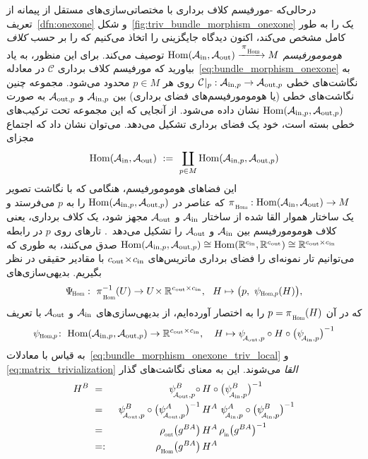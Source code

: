درحالی‌که -مورفیسم کلاف برداری با مختصاتی‌سازی‌های مستقل از پیمانه از تعریف~\ref{dfn:onexone} و شکل~\ref{fig:triv_bundle_morphism_onexone} یک \onexoneGM را به طور کامل مشخص می‌کند، اکنون دیدگاه جایگزینی را اتخاذ می‌کنیم که \onexoneGMs را بر حسب \emph{کلاف هومومورفیسم} $\Hom(\Ain,\Aout) \xrightarrow{\,\piHom\,} M$ توصیف می‌کند.
برای این منظور، به یاد بیاورید که مورفیسم کلاف برداری $\mathcal{C}$ در معادله~\eqref{eq:bundle_morphism_onexone} به نگاشت‌های خطی ${\mathcal{C}\!\:|_p}: \mathcal{A}_{\textup{in},p}\to\mathcal{A}_{\textup{out},p}$ روی هر $p\in M$ محدود می‌شود.
مجموعه چنین نگاشت‌های خطی (یا هومومورفیسم‌های فضای برداری) بین $\mathcal{A}_{\textup{in},p}$ و $\mathcal{A}_{\textup{out},p}$ به صورت $\operatorname{Hom}(\mathcal{A}_{\textup{in},p},\mathcal{A}_{\textup{out},p})$ نشان داده می‌شود.
از آنجایی که این مجموعه تحت ترکیب‌های خطی بسته است، خود یک فضای برداری تشکیل می‌دهد.
می‌توان نشان داد که اجتماع مجزای
\begin{align}
    \operatorname{Hom}(\mathcal{A}_\textup{in},\mathcal{A}_\textup{out})\ :=\ \coprod_{p\in M} \operatorname{Hom}(\mathcal{A}_{\textup{in},p},\mathcal{A}_{\textup{out},p})
\end{align}
این فضاهای هومومورفیسم، هنگامی که با نگاشت تصویر $\piHom: \Hom(\Ain,\Aout) \to M$ که عناصر در $\operatorname{Hom}(\mathcal{A}_{\textup{in},p},\mathcal{A}_{\textup{out},p})$ را به $p$ می‌فرستد و یک ساختار هموار القا شده از ساختار $\mathcal{A}_\textup{in}$ و $\mathcal{A}_\textup{out}$ مجهز شود، یک کلاف برداری، یعنی کلاف هومومورفیسم بین $\mathcal{A}_\textup{in}$ و $\mathcal{A}_\textup{out}$ را تشکیل می‌دهد~\cite{dundas2018differentialTopology}.
تارهای روی $p$ در رابطه $\operatorname{Hom}(\mathcal{A}_{\textup{in},p},\mathcal{A}_{\textup{out},p}) \cong \operatorname{Hom}(\mathbb{R}^{c_\textup{in}},\mathbb{R}^{c_\textup{out}}) \cong \mathbb{R}^{{c_\textup{out}}\times{c_\textup{in}}}$ صدق می‌کنند، به طوری که می‌توانیم تار نمونه‌ای را فضای برداری ماتریس‌های ${{c_\textup{out}}\!\times\!{c_\textup{in}}}$ با مقادیر حقیقی در نظر بگیریم.
بدیهی‌سازی‌های
\begin{align}
    \PsiHom:\ \piHom^{-1}(U) \to U\!\times\R^{\cout\times\cin},\ \ H\mapsto \big(p,\ \psiHomp(H)\big) ,
\end{align}
که در آن $p=\piHom(H)$ را به اختصار آورده‌ایم، از بدیهی‌سازی‌های $\mathcal{A}_\textup{in}$ و $\mathcal{A}_\textup{out}$ با تعریف
\begin{align}\label{eq:Hom_bdl_triv_ptwise}
    \psiHomp\!:\ \Hom(\Ainp,\Aoutp) \to \R^{\cout\times\cin} ,\ \ \ H\mapsto \psiAoutp \circ H \circ \big(\psiAinp\big)^{-1}
\end{align}
به قیاس با معادلات~\eqref{eq:bundle_morphism_onexone_triv_local} و \eqref{eq:matrix_trivialization} \emph{القا} می‌شوند.
این به معنای نگاشت‌های گذار
\begin{alignat}{3}
    H^B
    \ &=&\ \psiAoutp^B \circ\,&H \circ \big(\psiAinp^B\big)^{-1} \notag \\
    \ &=&\ \psiAoutp^B \circ \big(\psiAoutp^A\big)^{-1}\,&H^A\ \psiAinp^A \circ \big(\psiAinp^B\big)^{-1} \notag \\
    \ &=&\ \rhoout\big(g^{BA}\big)\, &H^A\, \rhoin\big(g^{BA}\big)^{-1} \notag \\
    \ &=:&\ \rhoHom\big(g^{BA}\big)\, &H^A
\end{alignat}
